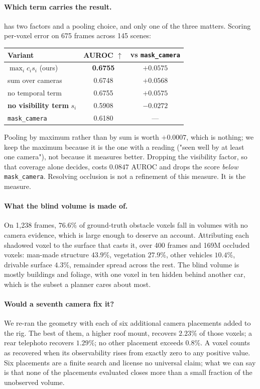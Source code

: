 \documentclass[10pt,twocolumn,letterpaper]{article}
\begin{document}
\paragraph{Which term carries the result.}  has two factors and
a pooling choice, and only one of the three matters. Scoring per-voxel error
on 675 frames across 145 scenes:
\begin{center}\small
\begin{tabular}{lcc}
\toprule
Variant & AUROC $\uparrow$ & vs \texttt{mask\_camera} \\
\midrule
$\max_i c_i s_i$ \;(ours)        & \textbf{0.6755} & $+0.0575$ \\
sum over cameras                 & 0.6748 & $+0.0568$ \\
no temporal term                 & 0.6755 & $+0.0575$ \\
\textbf{no visibility term} $s_i$ & 0.5908 & $\mathbf{-0.0272}$ \\
\texttt{mask\_camera}            & 0.6180 & --- \\
\bottomrule
\end{tabular}
\end{center}
Pooling by maximum rather than by sum is worth $+0.0007$, which is nothing;
we keep the maximum because it is the one with a reading ("seen well by at
least one camera"), not because it measures better. Dropping the visibility
factor, so that coverage alone decides, costs $0.0847$ AUROC and drops the
score \emph{below} \texttt{mask\_camera}. Resolving occlusion is not a
refinement of this measure. It is the measure.

\paragraph{What the blind volume is made of.} On 1{,}238 frames, $76.6\%$
of ground-truth obstacle voxels fall in volumes with no camera evidence,
which is large enough to deserve an account. Attributing each shadowed
voxel to the surface that casts it, over 400 frames and 169M occluded
voxels: man-made structure $43.9\%$, vegetation $27.9\%$, other vehicles
$10.4\%$, drivable surface $4.3\%$, remainder spread across the rest. The
blind volume is mostly buildings and foliage, with one voxel in ten hidden
behind another car, which is the subset a planner cares about most.

\paragraph{Would a seventh camera fix it?} We
re-ran the geometry with each of six additional camera placements added to
the rig. The best of them, a higher roof mount, recovers $2.23\%$ of those
voxels; a rear telephoto recovers $1.29\%$; no other placement exceeds
$0.8\%$. A voxel counts as recovered when its observability rises from exactly zero
to any positive value. Six placements are a finite search and license no
universal claim; what we can say is that none of the placements evaluated
closes more than a small fraction of the unobserved volume.
\end{document}
